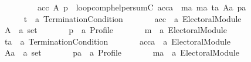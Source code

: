 \begin{isabellebody}
\ \ \ \ \ \ \ \ \ \ \ \ \ \ acc\ A\ p\ {\isacharequal}{\kern0pt}\ loop{\isacharunderscore}{\kern0pt}comp{\isacharunderscore}{\kern0pt}helper{\isacharunderscore}{\kern0pt}sumC\ {\isacharparenleft}{\kern0pt}acca\ {\isasymtriangleright}\ ma{\isacharcomma}{\kern0pt}\ ma{\isacharcomma}{\kern0pt}\ ta{\isacharcomma}{\kern0pt}\ Aa{\isacharcomma}{\kern0pt}\ pa{\isacharparenright}{\kern0pt}{\isachardoublequoteclose}\isanewline
\ \ \isamarkupfalse%
\ {\isacharminus}{\kern0pt}\isanewline
\ \ \ \ \isamarkupfalse%
\isanewline
\ \ \ \ \ \ t\ {\isacharcolon}{\kern0pt}{\isacharcolon}{\kern0pt}\ {\isachardoublequoteopen}{\isacharprime}{\kern0pt}a\ Termination{\isacharunderscore}{\kern0pt}Condition{\isachardoublequoteclose}\ \isanewline
\ \ \ \ \ \ acc\ {\isacharcolon}{\kern0pt}{\isacharcolon}{\kern0pt}\ {\isachardoublequoteopen}{\isacharprime}{\kern0pt}a\ Electoral{\isacharunderscore}{\kern0pt}Module{\isachardoublequoteclose}\ \isanewline
\ \ \ \ \ \ A\ {\isacharcolon}{\kern0pt}{\isacharcolon}{\kern0pt}\ {\isachardoublequoteopen}{\isacharprime}{\kern0pt}a\ set{\isachardoublequoteclose}\ \isanewline
\ \ \ \ \ \ p\ {\isacharcolon}{\kern0pt}{\isacharcolon}{\kern0pt}\ {\isachardoublequoteopen}{\isacharprime}{\kern0pt}a\ Profile{\isachardoublequoteclose}\ \isanewline
\ \ \ \ \ \ m\ {\isacharcolon}{\kern0pt}{\isacharcolon}{\kern0pt}\ {\isachardoublequoteopen}{\isacharprime}{\kern0pt}a\ Electoral{\isacharunderscore}{\kern0pt}Module{\isachardoublequoteclose}\ \isanewline
\ \ \ \ \ \ ta\ {\isacharcolon}{\kern0pt}{\isacharcolon}{\kern0pt}\ {\isachardoublequoteopen}{\isacharprime}{\kern0pt}a\ Termination{\isacharunderscore}{\kern0pt}Condition{\isachardoublequoteclose}\ \isanewline
\ \ \ \ \ \ acca\ {\isacharcolon}{\kern0pt}{\isacharcolon}{\kern0pt}\ {\isachardoublequoteopen}{\isacharprime}{\kern0pt}a\ Electoral{\isacharunderscore}{\kern0pt}Module{\isachardoublequoteclose}\ \isanewline
\ \ \ \ \ \ Aa\ {\isacharcolon}{\kern0pt}{\isacharcolon}{\kern0pt}\ {\isachardoublequoteopen}{\isacharprime}{\kern0pt}a\ set{\isachardoublequoteclose}\ \isanewline
\ \ \ \ \ \ pa\ {\isacharcolon}{\kern0pt}{\isacharcolon}{\kern0pt}\ {\isachardoublequoteopen}{\isacharprime}{\kern0pt}a\ Profile{\isachardoublequoteclose}\ \isanewline
\ \ \ \ \ \ ma\ {\isacharcolon}{\kern0pt}{\isacharcolon}{\kern0pt}\ {\isachardoublequoteopen}{\isacharprime}{\kern0pt}a\ Electoral{\isacharunderscore}{\kern0pt}Module{\isachardoublequoteclose}\isanewline

\end{isabellebody}
